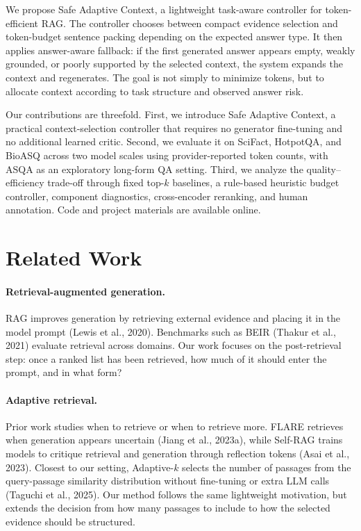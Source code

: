 \documentclass[11pt]{article}
\begin{document}
We propose Safe Adaptive Context, a lightweight task-aware controller for token-efficient RAG. The controller chooses between compact evidence selection and token-budget sentence packing depending on the expected answer type. It then applies answer-aware fallback: if the first generated answer appears empty, weakly grounded, or poorly supported by the selected context, the system expands the context and regenerates. The goal is not simply to minimize tokens, but to allocate context according to task structure and observed answer risk.

Our contributions are threefold. First, we introduce Safe Adaptive Context, a practical context-selection controller that requires no generator fine-tuning and no additional learned critic. Second, we evaluate it on SciFact, HotpotQA, and BioASQ across two model scales using provider-reported token counts, with ASQA as an exploratory long-form QA setting. Third, we analyze the quality--efficiency trade-off through fixed top-$k$ baselines, a rule-based heuristic budget controller, component diagnostics, cross-encoder reranking, and human annotation. Code and project materials are available online.

\section{Related Work}

\paragraph{Retrieval-augmented generation.}
RAG improves generation by retrieving external evidence and placing it in the model prompt (Lewis et al., 2020). Benchmarks such as BEIR (Thakur et al., 2021) evaluate retrieval across domains. Our work focuses on the post-retrieval step: once a ranked list has been retrieved, how much of it should enter the prompt, and in what form?

\paragraph{Adaptive retrieval.}
Prior work studies when to retrieve or when to retrieve more. FLARE retrieves when generation appears uncertain (Jiang et al., 2023a), while Self-RAG trains models to critique retrieval and generation through reflection tokens (Asai et al., 2023). Closest to our setting, Adaptive-$k$ selects the number of passages from the query-passage similarity distribution without fine-tuning or extra LLM calls (Taguchi et al., 2025). Our method follows the same lightweight motivation, but extends the decision from how many passages to include to how the selected evidence should be structured.
\end{document}

